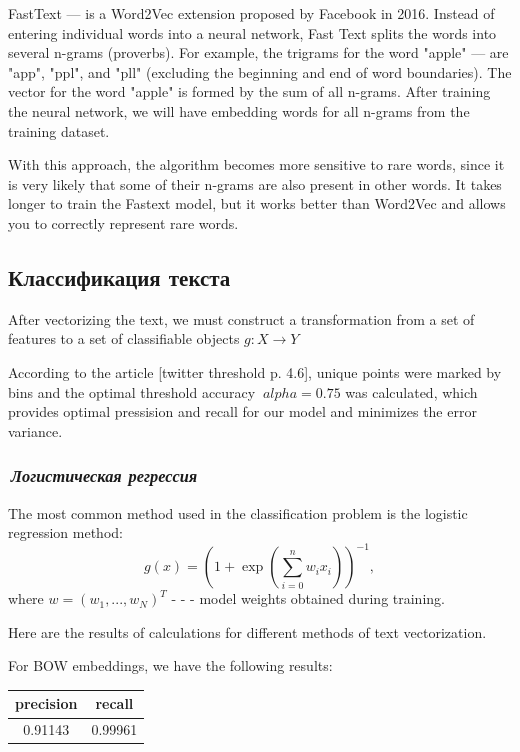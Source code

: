 \documentclass[12pt]{article}
\begin{document}
FastText --- is a Word2Vec extension proposed by Facebook in 2016. Instead of entering individual words into a neural network, Fast Text splits the words into several n-grams (proverbs). For example, the trigrams for the word "apple" --- are "app", "ppl", and "pll" (excluding the beginning and end of word boundaries). The vector for the word "apple" is formed by the sum of all n-grams. After training the neural network, we will have embedding words for all n-grams from the training dataset.

With this approach, the algorithm becomes more sensitive to rare words, since it is very likely that some of their n-grams are also present in other words. It takes longer to train the Fastext model, but it works better than Word2Vec and allows you to correctly represent rare words.

\subsection*{Классификация текста}
After vectorizing the text, we must construct a transformation from a set of features to a set of classifiable objects $g: X \rightarrow Y$

According to the article [twitter threshold p. 4.6], unique points were marked by bins and the optimal threshold accuracy $ \ alpha = 0.75$ was calculated, which provides optimal pressision and recall for our model and minimizes the error variance.

\subsubsection*{\it\,Логистическая регрессия}
The most common method used in the classification problem is the logistic regression method:
$$
g(x) = \left(1 + \exp{ \left( \sum_{i=0}^n w_i x_i  \right) }\right)^{-1},
$$
where $w=(w_1,..., w_N)^T$ - - - model weights obtained during training.

Here are the results of calculations for different methods of text vectorization.

For BOW embeddings, we have the following results:
\begin{center}
  \begin{tabular}{ | c | c |}
    \hline
     precision & recall \\ \hline
     0.91143 & 0.99961 \\ \hline
  \end{tabular}
\end{center}
\end{document}

